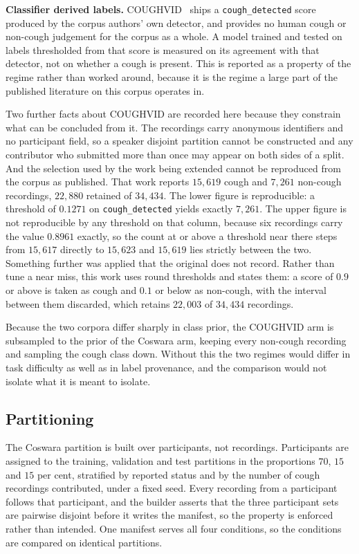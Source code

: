 \documentclass[pdflatex,sn-mathphys-num]{sn-jnl}
\begin{document}
\textbf{Classifier derived labels.} COUGHVID~\cite{coughvid2021} ships a
\texttt{cough\_detected} score produced by the corpus authors' own detector, and provides
no human cough or non-cough judgement for the corpus as a whole. A model trained and
tested on labels thresholded from that score is measured on its agreement with that
detector, not on whether a cough is present. This is reported as a property of the
regime rather than worked around, because it is the regime a large part of the published
literature on this corpus operates in.

Two further facts about COUGHVID are recorded here because they constrain what can be
concluded from it. The recordings carry anonymous identifiers and no participant field,
so a speaker disjoint partition cannot be constructed and any contributor who submitted
more than once may appear on both sides of a split. And the selection used by the work
being extended cannot be reproduced from the corpus as published. That work reports
$15{,}619$ cough and $7{,}261$ non-cough recordings, $22{,}880$ retained of $34{,}434$.
The lower figure is reproducible: a threshold of $0.1271$ on \texttt{cough\_detected}
yields exactly $7{,}261$. The upper figure is not reproducible by any threshold on that
column, because six recordings carry the value $0.8961$ exactly, so the count at or above
a threshold near there steps from $15{,}617$ directly to $15{,}623$ and $15{,}619$ lies
strictly between the two. Something further was applied that the original does not
record. Rather than tune a near miss, this work uses round thresholds and states them:
a score of $0.9$ or above is taken as cough and $0.1$ or below as non-cough, with the
interval between them discarded, which retains $22{,}003$ of $34{,}434$ recordings.

Because the two corpora differ sharply in class prior, the COUGHVID arm is subsampled to
the prior of the Coswara arm, keeping every non-cough recording and sampling the cough
class down. Without this the two regimes would differ in task difficulty as well as in
label provenance, and the comparison would not isolate what it is meant to isolate.

\subsection{Partitioning}\label{sec:setup-split}

The Coswara partition is built over participants, not recordings. Participants are
assigned to the training, validation and test partitions in the proportions $70$, $15$ and
$15$ per cent, stratified by reported status and by the number of cough recordings
contributed, under a fixed seed. Every recording from a participant follows that
participant, and the builder asserts that the three participant sets are pairwise
disjoint before it writes the manifest, so the property is enforced rather than intended.
One manifest serves all four conditions, so the conditions are compared on identical
partitions.
\end{document}
